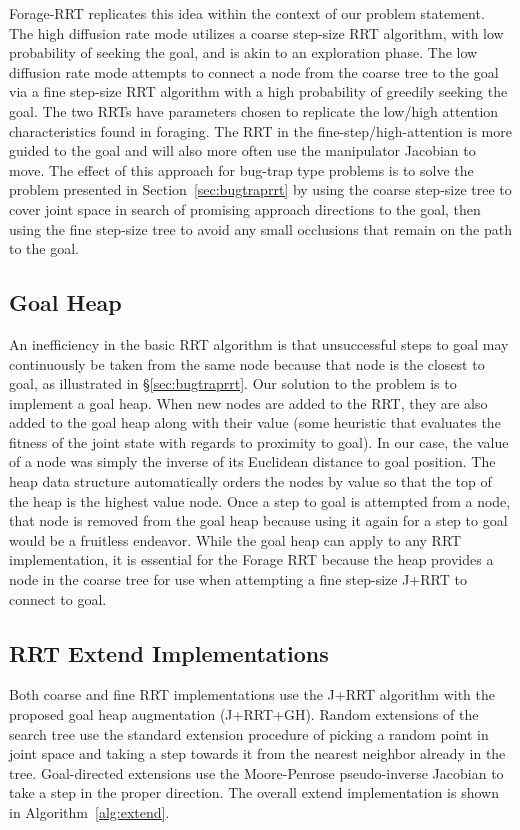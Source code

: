 \documentclass[conference]{IEEEtran}
\begin{document}
Forage-RRT replicates this idea within the context of our problem
statement.  The high diffusion rate mode utilizes a coarse step-size RRT
algorithm, with low probability of seeking the goal, and is akin to 
an exploration phase.  The low diffusion rate mode attempts to connect a node 
from the coarse tree to the goal via a fine step-size RRT algorithm with a
high probability of greedily seeking the goal.  The two RRTs have parameters
chosen to replicate the low/high attention characteristics found in
foraging.  The RRT in the fine-step/high-attention is more guided to the 
goal and will also more often use the manipulator Jacobian to move.  The
effect of this approach for bug-trap type problems is to solve the problem
presented in Section~\ref{sec:bugtraprrt} by using the coarse step-size tree
to cover joint space in search of promising approach directions to the goal,
then using the fine step-size tree to avoid any small occlusions that remain
on the path to the goal.

\subsection{Goal Heap}
An inefficiency in the basic RRT algorithm is that unsuccessful steps to
goal may continuously be taken from the same node because that node is the
closest to goal, as illustrated in \S\ref{sec:bugtraprrt}.
Our solution to the problem is to implement a goal heap. 
When new nodes are added to the RRT, they are also added to the goal heap
along with their value (some heuristic that evaluates the fitness of the
joint state with regards to proximity to goal). In our case, the value of a
node was simply the inverse of its Euclidean distance to goal position. The
heap data structure automatically orders the nodes by value so that the top
of the heap is the highest value node. Once a step to goal is attempted from
a node, that node is removed from the goal heap because using it again for a
step to goal would be a fruitless endeavor.  While the goal heap can apply
to any RRT implementation, it is essential for the Forage RRT because the
heap provides a node in the coarse tree for use when attempting a fine 
step-size J+RRT to connect to goal.

\subsection{RRT Extend Implementations}
Both coarse and fine RRT implementations use the J+RRT algorithm 
\cite{vahrenkamp09} with the proposed goal heap augmentation (J+RRT+GH).  
Random extensions of the search tree use the
standard extension procedure of picking a random point in joint space and
taking a step towards it from the nearest neighbor already in the tree. 
Goal-directed extensions use the Moore-Penrose pseudo-inverse Jacobian to 
take a step in the proper direction.  The overall extend implementation is 
shown in Algorithm~\ref{alg:extend}. 
\end{document}
